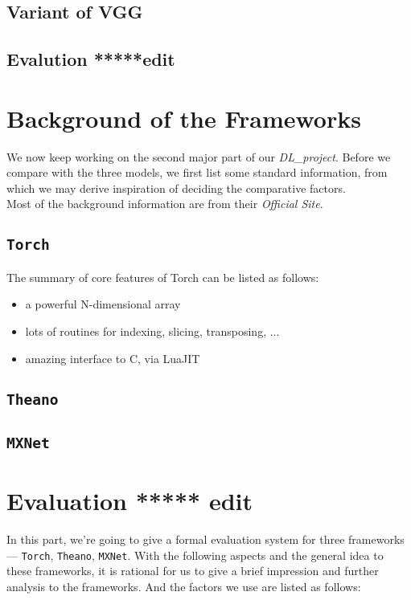 \documentclass[12pt]{article}
\begin{document}
\subsection{Variant of VGG}

\subsection{Evalution *****edit}




\section{Background of the Frameworks}

We now keep working on the second major part of our {\it DL\_project}. Before we compare with the three models, we first list some standard information, from which we may derive inspiration of deciding the comparative factors.\\
Most of the background information are from their {\it Official Site}.

\subsection{\texttt{Torch}}
The summary of core features of Torch can be listed as follows:
\begin{itemize}
	\item a powerful N-dimensional array
	\item lots of routines for indexing, slicing, transposing, ...
	\item amazing interface to C, via LuaJIT
\end{itemize}
\subsection{\texttt{Theano}}

\subsection{\texttt{MXNet}}



\section{Evaluation ***** edit}
In this part, we're going to give a formal evaluation system for three frameworks --- \texttt{Torch}, \texttt{Theano}, \texttt{MXNet}. With the following aspects and the general idea to these frameworks, it is rational for us to give a brief impression and further analysis to the frameworks. And the factors we use are listed as follows:
\end{document}
